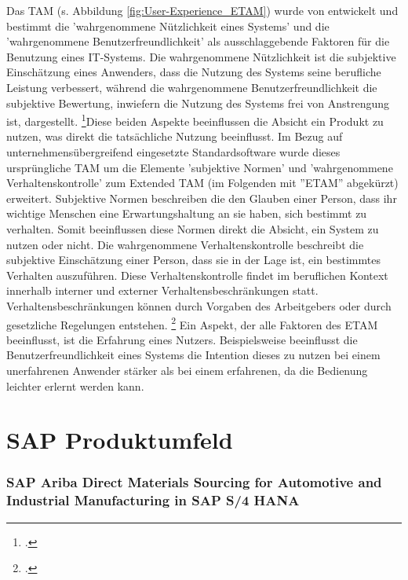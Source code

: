 Das TAM (s. Abbildung \ref{fig:User-Experience_ETAM}) wurde von \cite[][]{theorie_davis_tam_1989} entwickelt und bestimmt die 'wahrgenommene Nützlichkeit eines Systems' und die 'wahrgenommene Benutzerfreundlichkeit' als ausschlaggebende Faktoren für die Benutzung eines IT-Systems. Die wahrgenommene Nützlichkeit ist die subjektive Einschätzung eines Anwenders, dass die Nutzung des Systems seine berufliche Leistung verbessert, während die wahrgenommene Benutzerfreundlichkeit die subjektive Bewertung, inwiefern die Nutzung des Systems frei von Anstrengung ist, dargestellt. \footcite[Vgl.][S. 985]{theorie_davis_tam_1989}Diese beiden Aspekte beeinflussen die Absicht ein Produkt zu nutzen, was direkt die tatsächliche Nutzung beeinflusst. Im Bezug auf unternehmensübergreifend eingesetzte Standardsoftware wurde dieses ursprüngliche TAM um die Elemente 'subjektive Normen' und 'wahrgenommene Verhaltenskontrolle' zum Extended TAM (im Folgenden mit ''ETAM'' abgekürzt) erweitert. Subjektive Normen beschreiben die den Glauben einer Person, dass ihr wichtige Menschen eine Erwartungshaltung an sie haben, sich bestimmt zu verhalten. Somit beeinflussen diese Normen direkt die Absicht, ein System zu nutzen oder nicht. Die wahrgenommene Verhaltenskontrolle beschreibt die subjektive Einschätzung einer Person, dass sie in der Lage ist, ein bestimmtes Verhalten auszuführen. Diese Verhaltenskontrolle findet im beruflichen Kontext innerhalb interner und externer Verhaltensbeschränkungen statt. Verhaltensbeschränkungen können \zB durch Vorgaben des Arbeitgebers oder durch gesetzliche Regelungen entstehen. \footcite[Vgl.][S. 3f]{theorie_kohnke_extended_tam_2023} Ein Aspekt, der alle Faktoren des ETAM beeinflusst, ist die Erfahrung eines Nutzers. Beispielsweise beeinflusst die Benutzerfreundlichkeit eines Systems die Intention dieses zu nutzen bei einem unerfahrenen Anwender stärker als bei einem erfahrenen, da die Bedienung leichter erlernt werden kann.

\section{SAP Produktumfeld}

\subsubsection{SAP Ariba Direct Materials Sourcing for Automotive and Industrial Manufacturing in SAP S/4 HANA}

